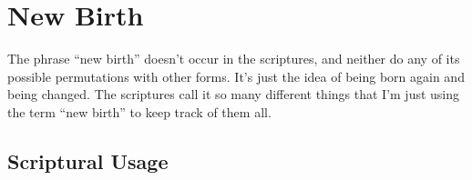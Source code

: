 \section{New Birth}
	\label{NEWBIRTH}
	
	The phrase ``new birth'' doesn't occur in the scriptures, and neither do any of its possible permutations with other forms. It's just the idea of being born again and being changed. The scriptures call it so many different things that I'm just using the term ``new birth'' to keep track of them all.
	





\subsection{Scriptural Usage} %
	\label{NEWBIRTH-SCRIPTURES}

	
